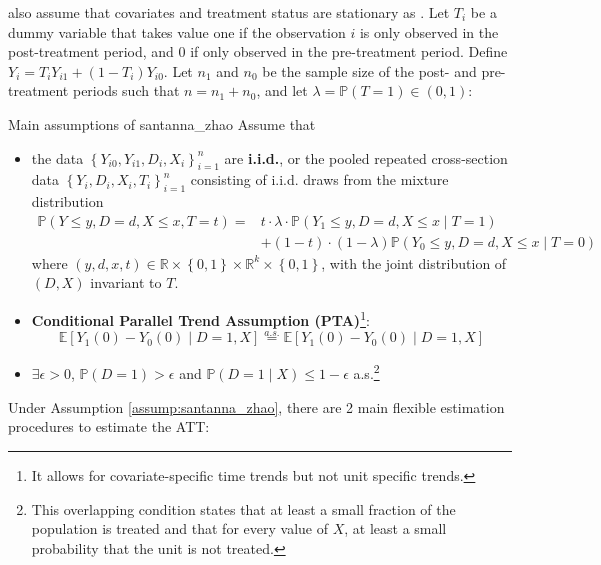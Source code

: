 \documentclass[twoside]{article}
\begin{document}
\citet{sant2020doubly} also assume that covariates and treatment status are stationary as \citet{abadie2005semiparametric}. Let $T_i$ be a dummy variable that takes value one if the observation $i$ is only observed in the post-treatment period, and 0 if only observed in the pre-treatment period. Define $Y_i = T_iY_{i1}+\left(1-T_i\right)Y_{i0}$. Let $n_1$ and $n_0$ be the sample size of the post- and pre-treatment periods such that $n=n_1+n_0$, and let $\lambda = \mathbb{P}\left(T=1\right)\in \left(0,1\right)$:
\begin{assumption}{Main assumptions of \citet{sant2020doubly}}{santanna_zhao}
    Assume that
    \begin{itemize}
        \item[1] the data $\left\{Y_{i0},Y_{i1},D_i,X_i\right\}^n_{i=1}$ are \textbf{i.i.d.}, or the pooled repeated cross-section data $\left\{Y_i,D_i,X_i,T_i\right\}^n_{i=1}$ consisting of i.i.d. draws from the mixture distribution
        \begin{align*}
            \mathbb{P}\left(Y\leq y, D=d, X\leq x, T=t\right) =& t\cdot \lambda \cdot \mathbb{P}\left(Y_1\leq y, D=d, X\leq x \mid T=1\right)\\
            &+ \left(1-t\right)\cdot \left(1-\lambda\right) \mathbb{P}\left(Y_0\leq y, D=d, X\leq x \mid T=0\right)
        \end{align*}
        where $\left(y,d,x,t\right)\in \mathbb{R}\times \left\{0,1\right\}\times \mathbb{R}^k\times \left\{0,1\right\}$, with the joint distribution of $\left(D,X\right)$ invariant to $T$.
        \item[2] \textbf{Conditional Parallel Trend Assumption (PTA)}\footnote{It allows for covariate-specific time trends but not unit specific trends.}: $$ \mathbb{E}\left[Y_1(0)-Y_0(0)\mid D=1,X\right] \overset{a.s.}{=} \mathbb{E}\left[Y_1(0)-Y_0(0)\mid D=1,X\right] $$
        \item[3] $\exists \epsilon>0$, $\mathbb{P}\left(D=1\right)>\epsilon$ and $\mathbb{P}\left(D=1\mid X\right)\leq 1-\epsilon$ a.s.\footnote{This overlapping condition states that at least a small fraction of the population is treated and that for every value of $X$, at least a small probability that the unit is not treated.}
    \end{itemize}
\end{assumption}
Under Assumption \ref{assump:santanna_zhao}, there are 2 main flexible estimation procedures to estimate the ATT:
\end{document}
